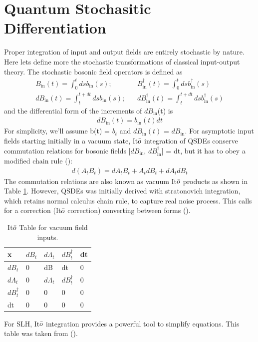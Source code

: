\documentclass[a4paper]{article}
\theoremstyle{definition}
\begin{document}
\section*{Quantum Stochasitic Differentiation}
Proper integration of input and output fields are entirely stochastic by nature. Here lets define more the stochastic transformations of classical input-output theory. The stochastic bosonic field operators is defined as 
\begin{align}
    B_{\text{in}}(t) = \int_0^t ds b_{\text{in}}(s) ; & \ \ \ \ B^\dagger_{\text{in}}(t) = \int_0^t ds b^\dagger_{\text{in}}(s) \\
    dB_{\text{in}}(t) = \int_t^{t+dt} ds b_{\text{in}}(s) ; & \ \ \ \ dB^\dagger_{\text{in}}(t) = \int_t^{t+dt} ds b^\dagger_{\text{in}}(s)
\end{align}
and the differential form of the increments of $dB_{\text{in}}$(t) is
\begin{align}
    dB_{\text{in}}(t) = b_{\text{in}}(t)dt
\end{align}
For simplicity, we'll assume b(t) = $b_t$ and $dB_\text{in}(t)$ = $dB_\text{in}$. 
For asymptotic input fields starting initially in a vacuum state, It$\Bar{o}$ integration of QSDEs conserve commutation relations for bosonic fields [$dB_{\text{in}}$, $dB^\dagger_{\text{in}}$] = dt, but it has to obey a modified chain rule (\citealp{Combes_2017,Gardiner_2004}): 
\begin{align}
    \label{eq:ito_chain}
    d(A_tB_t) = dA_tB_t + A_tdB_t + dA_tdB_t
\end{align}
The commutation relations are also known as vacuum It$\Bar{o}$ products as shown in Table \ref{tab:ito_table}. However, QSDEs was initially derived with stratonovich integration, which retains normal calculus chain rule, to capture real noise process. This calls for a correction (It$\Bar{o}$ correction) converting between forms (\citealp{Gardiner_2004}).  

\begin{table}[H]
    \centering
    \begin{tabular}{l|l l l l}

       x  & $dB_t$ & $d\Lambda_t$ & $dB^\dagger_t$ & dt\\
     \hline 
        $dB_t$ & 0 & dB & dt & 0\\
      $d\Lambda_t$ & 0 & $d\Lambda_t$ & $dB_t^\dagger$ & 0 \\
     $dB^\dagger_t$ & 0 & 0 & 0 & 0 \\
     dt & 0 & 0 & 0 & 0
    \end{tabular}
    \caption{It$\Bar{o}$ Table for vacuum field inputs.}
    \label{tab:ito_table}
\end{table}
For SLH, It$\Bar{o}$ integration provides a powerful tool to simplify equations. This table was taken from (\cite{Combes_2017}).
\end{document}
